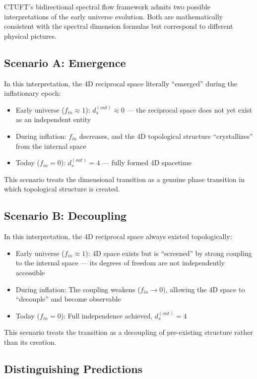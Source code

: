 CTUFT's bidirectional spectral flow framework admits two possible interpretations of the early universe evolution. Both are mathematically consistent with the spectral dimension formulas but correspond to different physical pictures.

\subsection{Scenario A: Emergence}
\label{subsec:scenario-emergence}

In this interpretation, the 4D reciprocal space literally ``emerged'' during the inflationary epoch:
\begin{itemize}
    \item Early universe ($f_{in} \approx 1$): $d_s^{(out)} \approx 0$ — the reciprocal space does not yet exist as an independent entity
    \item During inflation: $f_{in}$ decreases, and the 4D topological structure ``crystallizes'' from the internal space
    \item Today ($f_{in} = 0$): $d_s^{(out)} = 4$ — fully formed 4D spacetime
\end{itemize}

This scenario treats the dimensional transition as a genuine phase transition in which topological structure is created.

\subsection{Scenario B: Decoupling}
\label{subsec:scenario-decoupling}

In this interpretation, the 4D reciprocal space always existed topologically:
\begin{itemize}
    \item Early universe ($f_{in} \approx 1$): 4D space exists but is ``screened'' by strong coupling to the internal space — its degrees of freedom are not independently accessible
    \item During inflation: The coupling weakens ($f_{in} \to 0$), allowing the 4D space to ``decouple'' and become observable
    \item Today ($f_{in} = 0$): Full independence achieved, $d_s^{(out)} = 4$
\end{itemize}

This scenario treats the transition as a decoupling of pre-existing structure rather than its creation.

\subsection{Distinguishing Predictions}
\label{subsec:distinguishing-predictions}

